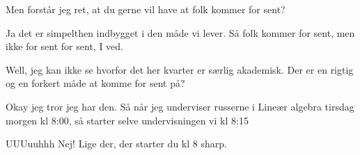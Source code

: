 \documentclass[a4paper,11pt]{article}
\begin{document}
\begin{sketch}
 Men forstår jeg ret, at du gerne vil have at folk kommer for sent?

 Ja det er simpelthen indbygget i den måde vi lever. Så folk kommer for sent, men ikke for sent for sent, I ved.

 Well, jeg kan ikke se hvorfor det her kvarter er særlig akademisk. Der er en rigtig og en forkert måde at komme for sent på?

 Okay jeg tror jeg har den. Så når jeg underviser russerne i Lineær algebra tirsdag morgen kl 8:00, så starter selve undervisningen vi kl 8:15

 UUUuuhhh Nej! Lige der, der starter du kl 8 sharp. 

\end{sketch}
\end{document}
